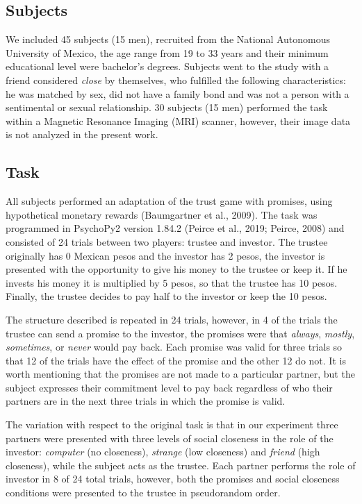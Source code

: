 \documentclass[12pt,]{article}
\begin{document}
\hypertarget{subjects}{%
\subsection{Subjects}\label{subjects}}

We included 45 subjects (15 men), recruited from the National Autonomous
University of Mexico, the age range from 19 to 33 years and their
minimum educational level were bachelor's degrees. Subjects went to the
study with a friend considered \emph{close} by themselves, who fulfilled
the following characteristics: he was matched by sex, did not have a
family bond and was not a person with a sentimental or sexual
relationship. 30 subjects (15 men) performed the task within a Magnetic
Resonance Imaging (MRI) scanner, however, their image data is not
analyzed in the present work.

\hypertarget{task}{%
\subsection{Task}\label{task}}

All subjects performed an adaptation of the trust game with promises,
using hypothetical monetary rewards (Baumgartner et al., 2009). The task
was programmed in PsychoPy2 version 1.84.2 (Peirce et al., 2019; Peirce,
2008) and consisted of 24 trials between two players: trustee and
investor. The trustee originally has 0 Mexican pesos and the investor
has 2 pesos, the investor is presented with the opportunity to give his
money to the trustee or keep it. If he invests his money it is
multiplied by 5 pesos, so that the trustee has 10 pesos. Finally, the
trustee decides to pay half to the investor or keep the 10 pesos.

The structure described is repeated in 24 trials, however, in 4 of the
trials the trustee can send a promise to the investor, the promises were
that \emph{always}, \emph{mostly}, \emph{sometimes}, or \emph{never}
would pay back. Each promise was valid for three trials so that 12 of
the trials have the effect of the promise and the other 12 do not. It is
worth mentioning that the promises are not made to a particular partner,
but the subject expresses their commitment level to pay back regardless
of who their partners are in the next three trials in which the promise
is valid.

The variation with respect to the original task is that in our
experiment three partners were presented with three levels of social
closeness in the role of the investor: \emph{computer} (no closeness),
\emph{strange} (low closeness) and \emph{friend} (high closeness), while
the subject acts as the trustee. Each partner performs the role of
investor in 8 of 24 total trials, however, both the promises and social
closeness conditions were presented to the trustee in pseudorandom
order.
\end{document}
